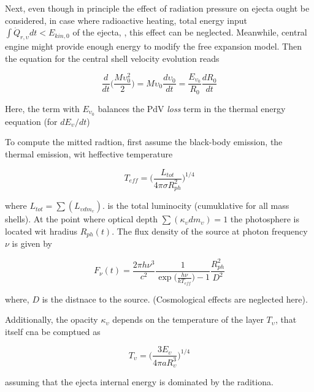 \documentclass[11pt,a4paper,headinclude=true,DIV=14,BCOR=8mm,chapterprefix,listof=totoc,twoside,openright,abstracton]{scrbook}
\begin{document}
Next, even though in principle the effect of radiation pressure on ejecta ought be considered, in case where radioactive heating, total energy input $\int \dot{Q}_{r,\upsilon}dt < E_{kin,0}$ of the ejecta, \cite{(Metzger et al 2011; Rosswog et al 2013)}, this effect can be neglected.
Meanwhile, central engine might provide enough energy to modify the free expansion model. Then the equation for the central shell velocity evolution reads 

\begin{equation}
    \label{eq:theory:mkn:velcenteng}
    \frac{d}{dt}\Bigg(\frac{M\upsilon_0^2}{2}\Bigg) = M\upsilon_0\frac{d\upsilon_0}{dt} = \frac{E_{\upsilon_0}}{R_0}\frac{dR_0}{dt}
\end{equation}

Here, the term with $E_{\upsilon_0}$ balances the PdV \textit{loss} term in the thermal energy eequation (for $dE_{\upsilon}/dt$)

To compute the mitted radtion, first assume the black-body emission, the thermal emission, wit heffective temperature 

\begin{equation}
    T_{eff} = \Bigg(\frac{L_{tot}}{4 \pi \sigma R_{ph}^2}\Bigg)^{1/4}
\end{equation}

where $L_{tot} = \sum(L_{\upsilon dm_{\upsilon}})$. is the total luminocity (cumuklative for all mass shells). 
At the point where optical depth $\sum(\kappa_{\upsilon}dm_{\upsilon})=1$ the photosphere is located wit hradius $R_{ph}(t)$. 
The flux density of the source at photon frequency $\nu$ is given by 

\begin{equation}
    F_{\nu}(t) = \frac{2\pi h \nu^3}{c^2} \frac{1}{\exp\Big(\frac{h\nu}{kT_{eff}}\Big) - 1} \frac{R_{ph}^2}{D^2}
\end{equation}

where, $D$ is the distnace to the source. (Cosmological effects are neglected here).

Additionally, the opacity $\kappa_{\upsilon}$ depends on the temperature of the layer $T_{\upsilon}$, that itself cna be comptued as 

\begin{equation}
    T_{\upsilon} = \Bigg(\frac{3E_{\upsilon}}{4\pi a R^{3}_{\upsilon}}\Bigg)^{1/4}
\end{equation}

assuming that the ejecta internal energy is dominated by the raditiona. 
\end{document}
